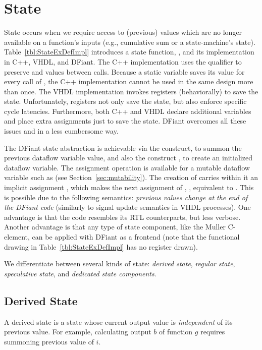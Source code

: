 \section{State}
State occurs when we require access to (previous) values which are no longer available on a function's inputs (e.g., cumulative sum or a state-machine's state). Table~\ref{tbl:StateExDefImpl} introduces a state function, , and its implementation in C++, VHDL, and DFiant. The C++ implementation uses the  qualifier to preserve  and  values between  calls. Because a static variable saves its value for every call of , the C++ implementation cannot be used in the same design more than once. The VHDL implementation invokes registers (behaviorally) to save the state. Unfortunately, registers not only save the state, but also enforce specific cycle latencies. Furthermore, both C++ and VHDL declare additional variables and place extra assignments just to save the state. DFiant overcomes all these issues and in a less cumbersome way.

The DFiant state abstraction is achievable via the  construct, to summon the previous dataflow variable value, and also the construct , to create an initialized dataflow variable. The \code{:=} assignment operation is available for a mutable dataflow variable such as  (see Section~\ref{sec:mutability}). The creation of  carries within it an implicit assignment , which makes the next assignment of , , equivalent to . This is possible due to the following semantics: \textit{previous values change at the end of the DFiant code} (similarly to signal update semantics in VHDL processes). One advantage is that the code resembles its RTL counterparts, but less verbose. Another advantage is that any type of state component, like the Muller C-element\cite{muller1957theory}, can be applied with DFiant as a frontend (note that the functional drawing in Table~\ref{tbl:StateExDefImpl} has no register drawn).


We differentiate between several kinds of state: \textit{derived state},  \textit{regular state}, \textit{speculative state}, and \textit{dedicated state components}. 

\subsection{Derived State} 
A derived state is a state whose current output value is \textit{independent} of its previous value. For example, calculating output $b$ of function $g$ requires summoning previous value of $i$. 

